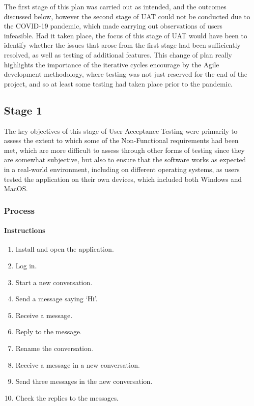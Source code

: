 The first stage of this plan was carried out as intended, and the outcomes discussed below, however the second stage of UAT could not be conducted due to the COVID-19 pandemic, which made carrying out observations of users infeasible. Had it taken place, the focus of this stage of UAT would have been to identify whether the issues that arose from the first stage had been sufficiently resolved, as well as testing of additional features. This change of plan really highlights the importance of the iterative cycles encourage by the Agile development methodology, where testing was not just reserved for the end of the project, and so at least some testing had taken place prior to the pandemic.

\subsection{Stage 1}\label{sec:stage1-uat}
The key objectives of this stage of User Acceptance Testing were primarily to assess the extent to which some of the Non-Functional requirements had been met, which are more difficult to assess through other forms of testing since they are somewhat subjective, but also to ensure that the software works as expected in a real-world environment, including on different operating systems, as users tested the application on their own devices, which included both Windows and MacOS.

\subsubsection{Process}

\paragraph{Instructions}
\begin{enumerate}
  \item Install and open the application.
  \item Log in.
  \item Start a new conversation.
  \item Send a message saying `Hi'.
  \item Receive a message.
  \item Reply to the message.
  \item Rename the conversation. 
  \item Receive a message in a new conversation.
  \item Send three messages in the new conversation.
  \item Check the replies to the messages.
\end{enumerate}


